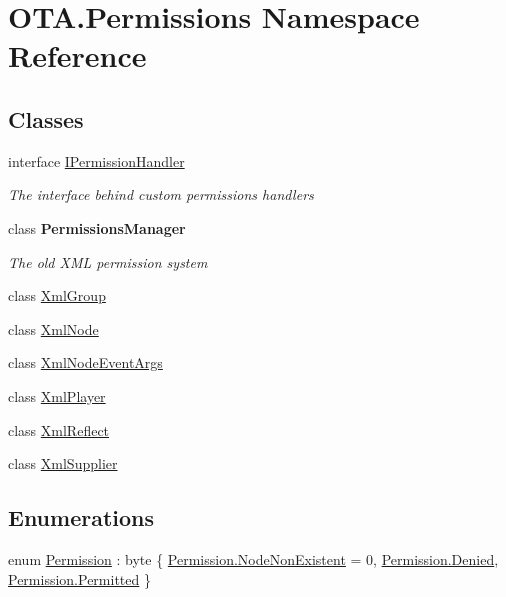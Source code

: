 \hypertarget{namespace_o_t_a_1_1_permissions}{}\section{O\+T\+A.\+Permissions Namespace Reference}
\label{namespace_o_t_a_1_1_permissions}
\subsection*{Classes}
\begin{DoxyCompactItemize}
\item 
interface \hyperlink{interface_o_t_a_1_1_permissions_1_1_i_permission_handler}{I\+Permission\+Handler}
\begin{DoxyCompactList}\small\item\em The interface behind custom permissions handlers \end{DoxyCompactList}\item 
class {\bfseries Permissions\+Manager}
\begin{DoxyCompactList}\small\item\em The old X\+M\+L permission system \end{DoxyCompactList}\item 
class \hyperlink{class_o_t_a_1_1_permissions_1_1_xml_group}{Xml\+Group}
\item 
class \hyperlink{class_o_t_a_1_1_permissions_1_1_xml_node}{Xml\+Node}
\item 
class \hyperlink{class_o_t_a_1_1_permissions_1_1_xml_node_event_args}{Xml\+Node\+Event\+Args}
\item 
class \hyperlink{class_o_t_a_1_1_permissions_1_1_xml_player}{Xml\+Player}
\item 
class \hyperlink{class_o_t_a_1_1_permissions_1_1_xml_reflect}{Xml\+Reflect}
\item 
class \hyperlink{class_o_t_a_1_1_permissions_1_1_xml_supplier}{Xml\+Supplier}
\end{DoxyCompactItemize}
\subsection*{Enumerations}
\begin{DoxyCompactItemize}
\item 
enum \hyperlink{namespace_o_t_a_1_1_permissions_a18c21ab0745d885bbcfdc768e07c31b6}{Permission} \+: byte \{ \hyperlink{namespace_o_t_a_1_1_permissions_a18c21ab0745d885bbcfdc768e07c31b6addc60370394507c38d92136a6dff6369}{Permission.\+Node\+Non\+Existent} = 0, 
\hyperlink{namespace_o_t_a_1_1_permissions_a18c21ab0745d885bbcfdc768e07c31b6a58d036b9b7f0e7eb38cfb90f1cc70a73}{Permission.\+Denied}, 
\hyperlink{namespace_o_t_a_1_1_permissions_a18c21ab0745d885bbcfdc768e07c31b6ad383a04a7397ca336d985e7e55d78ad5}{Permission.\+Permitted}
 \}
\end{DoxyCompactItemize}


